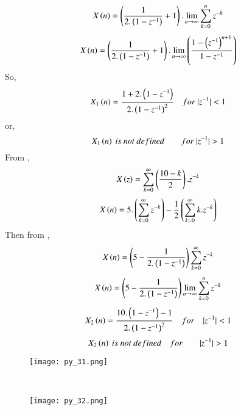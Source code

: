 \documentclass[beamer]{IEEEtran}
\theoremstyle{remark}
\begin{document}
$$X\left(n\right)=\left(\frac{1}{2.\left(1-z^{-1}\right)}+1\right).\lim_{n\to\infty}\sum_{k=0}^{n}z^{-k}$$
$$X\left(n\right)=\left(\frac{1}{2.\left(1-z^{-1}\right)}+1\right).\lim_{n\to\infty}\left(\frac{1-\left(z^{-1}\right)^{n+1}}{1-z^{-1}}\right)$$
So,
$$ X_1\left(n\right)=\frac{1+2.\left(1-z^{-1}\right)}{2.\left(1-z^{-1}\right)^2}\quad for\ |z^{-1}|<1$$
or,
$$X_1\brak{n}\ is\ not\ defined\qquad for\ |z^{-1}|>1 $$
From \brak{\ref{a14}},
$$X\left(z\right)=\sum_{k=0}^{\infty} \left(\frac{10-k}{2}\right).z^{-k}$$
$$X\left(n\right)=5.\left(\sum_{k=0}^{\infty}z^{-k}\right)-\frac{1}{2}\left(\sum_{k=0}^{\infty}k.z^{-k}\right)$$
Then from \brak{\ref{a18}},
$$X\left(n\right)=\left(5-\frac{1}{2.\left(1-z^{-1}\right)}\right)\sum_{k=0}^{\infty}z^{-k}$$
$$X\left(n\right)=\left(5-\frac{1}{2.\left(1-z^{-1}\right)}\right)\lim_{n\to\infty}\sum_{k=0}^{n}z^{-k}$$
$$X_2\left(n\right)=\frac{10.\left(1-z^{-1}\right)-1}{2.\left(1-z^{-1}\right)^2}\quad for\quad |z^{-1}|<1$$
$$X_2\brak{n}\ is\ not\ defined\quad for\qquad |z^{-1}|>1$$
\begin{figure}[h]
    \centering
    \texttt{[image: py\_31.png]}
    \label{fig:enter-label}
\end{figure}\\
\begin{figure}[h]
    \centering
    \texttt{[image: py\_32.png]}
    \label{fig:enter-label}
\end{figure}
\end{document}
